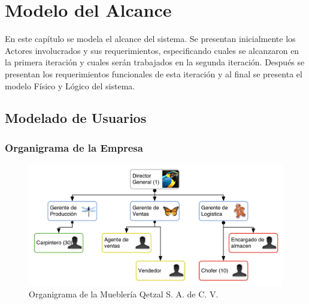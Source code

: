 \chapter{Modelo del Alcance}
\label{cap:reqUsr}

	En este capítulo se modela el alcance del sistema. Se presentan inicialmente los Actores involucrados y sus requerimientos, especificando cuales se alcanzaron en la primera iteración y cuales serán trabajados en la segunda iteración. Después se presentan los requerimientos funcionales de esta iteración y al final se presenta el modelo Físico y Lógico del sistema.


\section{Modelado de Usuarios}

\subsection{Organigrama de la Empresa}

	

\begin{figure}[htbp]
	\begin{center}
		\includegraphics[width=.8\textwidth]{images/organigramaEm}
		\caption{Organigrama de la Mueblería Qetzal S. A. de C. V.}
		\label{fig:organigrama}
	\end{center}
\end{figure}



